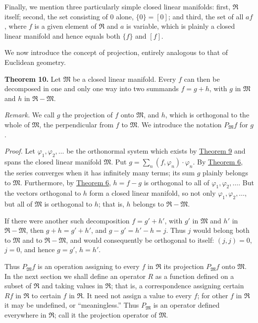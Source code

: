 \documentclass[fontsize=13pt,twoside,openany,headings=normal,parskip=false,bookmarkpackage=false,DIV=calc]{scrbook}
\begin{document}
Finally, we mention three particularly simple closed linear manifolds: first, $\mathfrak{R}$ itself; second, the set consisting of $0$ alone, $\{0\}=[0]$; and third, the set of all $af$, where $f$ is a given element of $\mathfrak{R}$ and $a$ is variable, which is plainly a closed linear manifold and hence equals both $\{f\}$ and $[f]$.

We now introduce the concept of projection, entirely analogous to that of Euclidean geometry.

\leavevmode{}\textbf{Theorem 10.}\label{thm:II.10} Let $\mathfrak{M}$ be a closed linear manifold. Every $f$ can then be decomposed in one and only one way into two summands $f=g+h$, with $g$ in $\mathfrak{M}$ and $h$ in $\mathfrak{R}-\mathfrak{M}$.

\emph{Remark.} We call $g$ the projection of $f$ onto $\mathfrak{M}$, and $h$, which is orthogonal to the whole of $\mathfrak{M}$, the perpendicular from $f$ to $\mathfrak{M}$. We introduce the notation $P_{\mathfrak{M}}f$ for $g$.

\emph{Proof.} Let $\varphi_1,\varphi_2,\ldots$ be the orthonormal system which exists by \hyperref[thm:II.9]{Theorem 9} and spans the closed linear manifold $\mathfrak{M}$. Put $g=\sum_n(f,\varphi_n)\cdot\varphi_n$. By \hyperref[thm:II.6]{Theorem 6}, the series converges when it has infinitely many terms; its sum $g$ plainly belongs to $\mathfrak{M}$. Furthermore, by \hyperref[thm:II.6]{Theorem 6}, $h=f-g$ is orthogonal to all of $\varphi_1,\varphi_2,\ldots$. But the vectors orthogonal to $h$ form a closed linear manifold, so not only $\varphi_1,\varphi_2,\ldots$, but all of $\mathfrak{M}$ is orthogonal to $h$; that is, $h$ belongs to $\mathfrak{R}-\mathfrak{M}$.

\hypertarget{origpage-40}{}%
If there were another such decomposition $f=g'+h'$, with $g'$ in $\mathfrak{M}$ and $h'$ in $\mathfrak{R}-\mathfrak{M}$, then $g+h=g'+h'$, and $g-g'=h'-h=j$. Thus $j$ would belong both to $\mathfrak{M}$ and to $\mathfrak{R}-\mathfrak{M}$, and would consequently be orthogonal to itself: $(j,j)=0$, $j=0$, and hence $g=g'$, $h=h'$.

Thus $P_{\mathfrak{M}}f$ is an operation assigning to every $f$ in $\mathfrak{R}$ its projection $P_{\mathfrak{M}}f$ onto $\mathfrak{M}$. In the next section we shall define an operator $R$ as a function defined on a subset of $\mathfrak{R}$ and taking values in $\mathfrak{R}$; that is, a correspondence assigning certain $Rf$ in $\mathfrak{R}$ to certain $f$ in $\mathfrak{R}$. It need not assign a value to every $f$; for other $f$ in $\mathfrak{R}$ it may be undefined, or ``meaningless.'' Thus $P_{\mathfrak{M}}$ is an operator defined everywhere in $\mathfrak{R}$; call it the projection operator of $\mathfrak{M}$.
\end{document}
